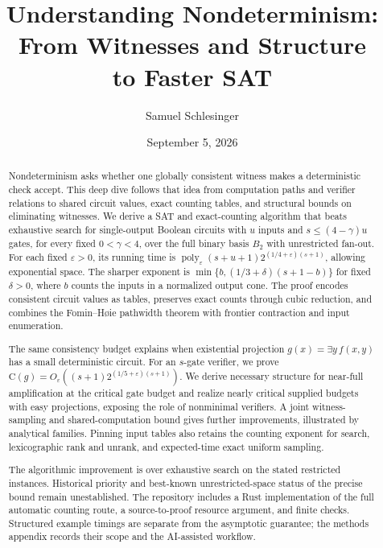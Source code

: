 \documentclass[11pt]{article}
\title{Understanding Nondeterminism:\\
  From Witnesses and Structure\\
  to Faster SAT}
\author{Samuel Schlesinger}
\date{September 5, 2026}
\theoremstyle{definition}
\theoremstyle{remark}
\newcommand{\C}{\mathrm{C}}
\newcommand{\poly}{\operatorname{poly}}
\begin{document}
\maketitle
\vspace{-1.5em}
\begin{abstract}
Nondeterminism asks whether one globally consistent witness makes a
deterministic check accept. This deep dive follows that idea from
computation paths and verifier relations to shared circuit values,
exact counting tables, and structural bounds on eliminating witnesses.
We derive a SAT and exact-counting algorithm that beats exhaustive
search for single-output Boolean circuits with $u$ inputs and
$s\le(4-\gamma)u$ gates, for every fixed $0<\gamma<4$, over the
full binary basis $B_2$ with unrestricted fan-out. For each fixed
$\varepsilon>0$, its running time is
$\poly_\varepsilon(s+u+1)2^{(1/4+\varepsilon)(s+1)}$, allowing
exponential space. The sharper exponent is
$\min\{b,(1/3+\delta)(s+1-b)\}$ for fixed $\delta>0$, where $b$
counts the inputs in a normalized output cone. The proof encodes
consistent circuit values as tables, preserves exact counts through
cubic reduction, and combines the Fomin--H\o ie pathwidth theorem
with frontier contraction and input enumeration.

The same consistency budget explains when existential projection
$g(x)=\exists y\,f(x,y)$ has a small deterministic circuit.
For an $s$-gate verifier, we prove
$\C(g)=O_\varepsilon((s+1)2^{(1/5+\varepsilon)(s+1)})$.
We derive necessary structure for near-full amplification at the
critical gate budget and realize nearly critical supplied budgets
with easy projections, exposing the role of nonminimal verifiers.
A joint witness-sampling and shared-computation bound gives further
improvements, illustrated by analytical families.
Pinning input tables also retains the counting exponent for search,
lexicographic rank and unrank, and expected-time exact uniform sampling.

The algorithmic improvement is over exhaustive search on the stated
restricted instances. Historical priority and best-known
unrestricted-space status of the precise bound remain unestablished.
The repository includes a Rust implementation of the full automatic
counting route, a source-to-proof resource argument, and finite checks.
Structured example timings are separate from the asymptotic guarantee;
the methods appendix records their scope and the AI-assisted workflow.
\end{abstract}

\clearpage
\setcounter{tocdepth}{1}
\tableofcontents
\clearpage
\end{document}
